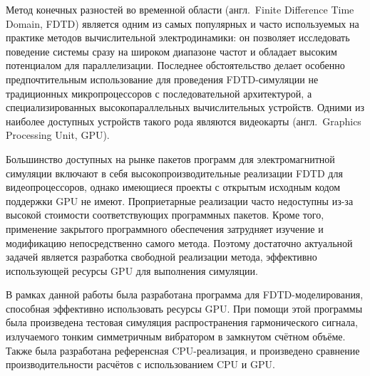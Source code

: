 
Метод конечных разностей во временной области (англ.~Finite Difference Time Domain, FDTD) является одним из самых популярных и часто используемых на практике методов вычислительной электродинамики: он позволяет исследовать поведение системы сразу на широком диапазоне частот и обладает высоким потенциалом для параллелизации. Последнее обстоятельство делает особенно предпочтительным использование для проведения FDTD-симуляции не традиционных микропроцессоров с последовательной архитектурой, а специализированных высокопараллельных вычислительных устройств. Одними из наиболее доступных устройств такого рода являются видеокарты (англ.~Graphics Processing Unit, GPU).

Большинство доступных на рынке пакетов программ для электромагнитной симуляции включают в себя высокопроизводительные реализации FDTD для видеопроцессоров, однако имеющиеся проекты с открытым исходным кодом поддержки GPU не имеют. Проприетарные реализации часто недоступны из-за высокой стоимости соответствующих программных пакетов. Кроме того, применение закрытого программного обеспечения затрудняет изучение и модификацию непосредственно самого метода. Поэтому достаточно актуальной задачей является разработка свободной реализации метода, эффективно использующей ресурсы GPU для выполнения симуляции.

В рамках данной работы была разработана программа для FDTD-моделирования, способная эффективно использовать ресурсы GPU. При помощи этой программы была произведена тестовая симуляция распространения гармонического сигнала, излучаемого тонким симметричным вибратором в замкнутом счётном объёме. Также была разработана референсная CPU-реализация, и произведено сравнение производительности расчётов с использованием CPU и GPU.

\clearpage